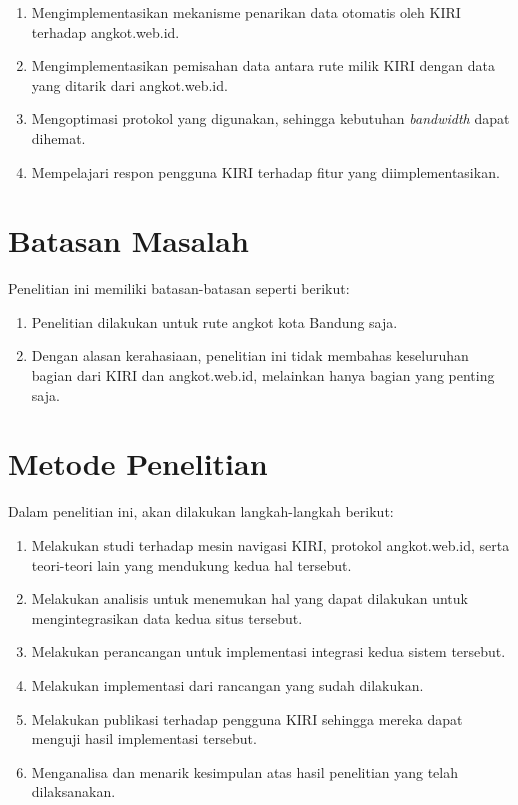 \begin{enumerate}
	\item Mengimplementasikan mekanisme penarikan data otomatis oleh KIRI terhadap angkot.web.id.
	\item Mengimplementasikan pemisahan data antara rute milik KIRI dengan data yang ditarik dari angkot.web.id.
	\item Mengoptimasi protokol yang digunakan, sehingga kebutuhan \textit{bandwidth} dapat dihemat.
	\item Mempelajari respon pengguna KIRI terhadap fitur yang diimplementasikan.
\end{enumerate}

\section{Batasan Masalah}

Penelitian ini memiliki batasan-batasan seperti berikut:

\begin{enumerate}
	\item Penelitian dilakukan untuk rute angkot kota Bandung saja.
	\item Dengan alasan kerahasiaan, penelitian ini tidak membahas keseluruhan bagian dari KIRI dan angkot.web.id, melainkan hanya bagian yang penting saja.
\end{enumerate}

\section{Metode Penelitian}

Dalam penelitian ini, akan dilakukan langkah-langkah berikut:

\begin{enumerate}
	\item Melakukan studi terhadap mesin navigasi KIRI, protokol angkot.web.id, serta teori-teori lain yang mendukung kedua hal tersebut.
	\item Melakukan analisis untuk menemukan hal yang dapat dilakukan untuk mengintegrasikan data kedua situs tersebut.
	\item Melakukan perancangan untuk implementasi integrasi kedua sistem tersebut.
	\item Melakukan implementasi dari rancangan yang sudah dilakukan.
	\item Melakukan publikasi terhadap pengguna KIRI sehingga mereka dapat menguji hasil implementasi tersebut.
	\item Menganalisa dan menarik kesimpulan atas hasil penelitian yang telah dilaksanakan.
\end{enumerate}

